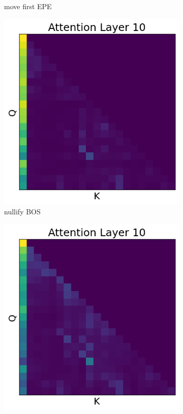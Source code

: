 \documentclass[11pt]{article}
\begin{document}
\begin{figure}[t!]
\begin{subfigure}[t]{0.22\textwidth}
    \caption{move first EPE}
    \label{fig:intervention3}
  \end{subfigure}
  \begin{subfigure}[t]{0.22\textwidth}
    \centering
    \includegraphics[width=0.85\columnwidth]{figures/obs4_intervention4.png}
    \caption{nullify BOS}
    \label{fig:intervention4}
  \end{subfigure}
  \begin{subfigure}[t]{0.22\textwidth}
    \centering
    \includegraphics[width=0.85\columnwidth]{figures/obs4_intervention5.png}

\end{subfigure}
\end{figure}
\end{document}
